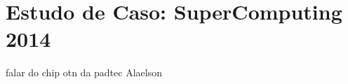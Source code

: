 \chapter{Estudo de Caso: SuperComputing 2014}
\label{cap:case}

falar do chip otn da padtec
Alaelson